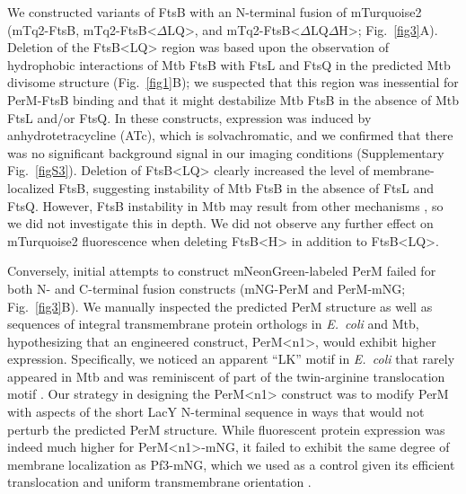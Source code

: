 \documentclass[pdflatex,sn-nature]{sn-jnl}%
\def\textsuperscript#1{<#1>}%
\newcommand\ec{\textit{E.~coli}}
\newcommand\mtb{Mtb}
\newcommand\ftsbLQ{FtsB\textsuperscript{LQ}}
\newcommand\ftsbH{FtsB\textsuperscript{H}}
\newcommand\ftsbdLQ{FtsB\textsuperscript{$\Delta{}$LQ}}
\newcommand\ftsbdLQdH{FtsB\textsuperscript{$\Delta{}$LQ$\Delta{}$H}}
\newcommand\permN{PerM\textsuperscript{n1}}
\begin{document}
We constructed variants of FtsB with an N-terminal fusion of mTurquoise2 (mTq2-FtsB, mTq2-\ftsbdLQ{}, and mTq2-\ftsbdLQdH{}; Fig.~\ref{fig3}A).
Deletion of the \ftsbLQ{} region was based upon the observation of hydrophobic interactions of Mtb FtsB with FtsL and FtsQ in the predicted Mtb divisome structure (Fig.~\ref{fig1}B); we suspected that this region was inessential for PerM-FtsB binding and that it might destabilize Mtb FtsB in the absence of Mtb FtsL and/or FtsQ.
In these constructs, expression was induced by anhydrotetracycline (ATc), which is solvachromatic, and we confirmed that there was no significant background signal in our imaging conditions (Supplementary Fig.~\ref{figS3}).
Deletion of \ftsbLQ{} clearly increased the level of membrane-localized FtsB, suggesting instability of \mtb{} FtsB in the absence of FtsL and FtsQ.
However, FtsB instability in \mtb{} may result from other mechanisms \citep{wangPersistentMycobacteriumTuberculosis2019}, so we did not investigate this in depth.
We did not observe any further effect on mTurquoise2 fluorescence when deleting \ftsbH{} in addition to \ftsbLQ{}.

Conversely, initial attempts to construct mNeonGreen-labeled PerM failed for both N- and C-terminal fusion constructs (mNG-PerM and PerM-mNG; Fig.~\ref{fig3}B).
We manually inspected the predicted PerM structure as well as sequences of integral transmembrane protein orthologs in \ec{} and \mtb{}, hypothesizing that an engineered construct, \permN{}, would exhibit higher expression.
Specifically, we noticed an apparent ``LK'' motif in \ec{} that rarely appeared in \mtb{} and was reminiscent of part of the twin-arginine translocation motif \citep{leeBacterialTwinArginineTranslocation2006}.
Our strategy in designing the \permN{} construct was to modify PerM with aspects of the short LacY N-terminal sequence in ways that would not perturb the predicted PerM structure.
While fluorescent protein expression was indeed much higher for \permN{}-mNG, it failed to exhibit the same degree of membrane localization as Pf3-mNG, which we used as a control given its efficient translocation and uniform transmembrane orientation \citep{kieferNegativelyChargedAmino1997}.
\end{document}

